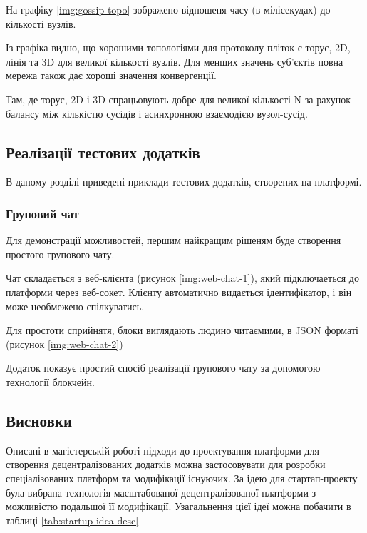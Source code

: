 \documentclass{lib/styles/default-style}
\begin{document}
    На графіку \ref{img:gossip-topo} зображено відношеня часу (в мілісекудах) до кількості вузлів.


    Із графіка видно, що хорошими топологіями для протоколу пліток є торус, 2D,
    лінія та 3D для великої кількості вузлів.
    Для менших значень суб'єктів повна мережа також дає хороші значення конвергенції.

    Там, де торус, 2D і 3D спрацьовують добре для великої кількості N
    за рахунок балансу між кількістю сусідів і асинхронною взаємодією вузол-сусід.
    
\subsection{Реалізації тестових додатків}

В даному розділі приведені приклади тестових додатків, створених на платформі.

\subsubsection{Груповий чат}

Для демонстрації можливостей, першим найкращим рішеням буде створення простого групового чату.

Чат складається з веб-клієнта (рисунок \ref{img:web-chat-1}), який підключаеться до платформи через веб-сокет.
Клієнту автоматично видається ідентифікатор, і він може необмежено спілкуватись.


Для простоти сприйнятя, блоки виглядають людино читаємими, в JSON форматі (рисунок \ref{img:web-chat-2})


Додаток показує простий спосіб реалізації групового чату за допомогою технології блокчейн.

\subsection{Висновки}

    \startStartupSection
    Описані в магістерській роботі підходи до проектування платформи для створення
    децентралізованих додатків
    можна застосовувати для розробки спеціалізованих платформ та модифікації існуючих.
    За ідею для стартап-проекту була вибрана технологія масштабованої децентралізованої
    платформи з можливістю подальшої її модифікації. Узагальнення цієї ідеї
    можна побачити в таблиці \ref{tab:startup-idea-desc}
\end{document}

